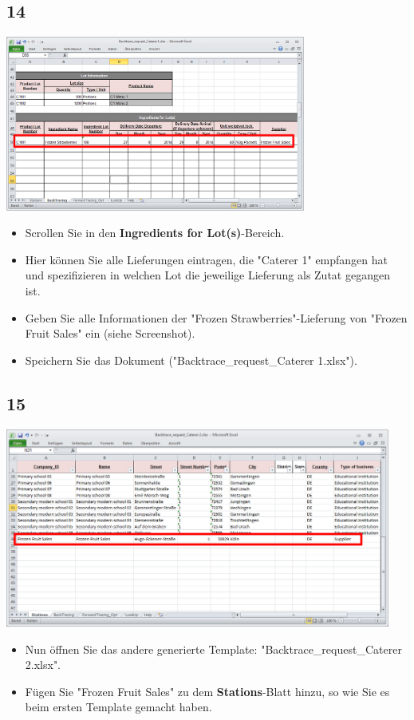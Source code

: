 \documentclass{beamer}
\begin{document}
\subsection{14}
\begin{frame}
	\begin{center}
  		\includegraphics[width=0.74\textwidth]{14.png}
	\end{center}
	\begin{itemize}
		\item Scrollen Sie in den \textbf{Ingredients for Lot(s)}-Bereich.
		\item Hier können Sie alle Lieferungen eintragen, die "Caterer 1" empfangen hat und spezifizieren in welchen Lot die jeweilige Lieferung als Zutat gegangen ist.
		\item Geben Sie alle Informationen der "Frozen Strawberries"-Lieferung von "Frozen Fruit Sales" ein (siehe Screenshot).
		\item Speichern Sie das Dokument ("Backtrace\_request\_Caterer 1.xlsx").
	\end{itemize}
\end{frame}

\subsection{15}
\begin{frame}
	\begin{center}
  		\includegraphics[width=0.95\textwidth]{15.png}
	\end{center}
	\begin{itemize}
		\item Nun öffnen Sie das andere generierte Template: "Backtrace\_request\_Caterer 2.xlsx".
		\item Fügen Sie "Frozen Fruit Sales" zu dem \textbf{Stations}-Blatt hinzu, so wie Sie es beim ersten Template gemacht haben.
	\end{itemize}
\end{frame}
\end{document}
